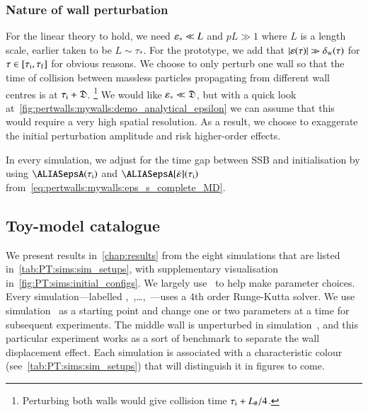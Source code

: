 \subsubsection{Nature of wall perturbation}
    For the linear theory to hold, we need $\varepsilon_\ast \ll L$ and $pL \gg 1$ where $L$ is a length scale, earlier taken to be $L\sim \tau_\ast$. For the prototype, we add that $\abs{\varepsilon(\tau)} \gg \delta_\mathrm{w}(\tau)$ for $\tau\in[\tau_\mathrm{i}, \tau_\mathrm{f}]$ for obvious reasons. %
    We choose to only perturb one wall so that the time of collision between massless particles propagating from different wall centres is at $ \tau_\mathrm{i} + \mathfrak{D}$.%
    \footnote{
        Perturbing both walls would give collision time $\tau_\mathrm{i} + L_{\#}/4$.
    } %
    We would like $\varepsilon_\ast \ll \mathfrak{D}$, but with a quick look at~\cref{fig:pertwalls:mywalls:demo_analytical_epsilon} we can assume that this would require a very high spatial resolution. As a result, we choose to exaggerate the initial perturbation amplitude and risk higher-order effects. %


    In every simulation, we adjust for the time gap between SSB and initialisation %
    by using $\epsA(\tau\ped{i})$ and $\epsA[\dot{\varepsilon}](\tau\ped{i})$ from~\cref{eq:pertwalls:mywalls:eps_s_complete_MD}.







\subsection{Toy-model catalogue}

   


    We present results in~\cref{chap:results} from the eight simulations that are listed in~\cref{tab:PT:sims:sim_setups}, with supplementary visualisation in~\cref{fig:PT:sims:initial_configs}. %
    We largely use~\citet{christiansenAsimulationDomainFormation2024} to help make parameter choices. 
    Every simulation---labelled ,~,\dots,~---uses a 4th order Runge-Kutta solver. 
    We use simulation~ as a starting point and change one or two parameters at a time for subsequent experiments. The middle wall is unperturbed in simulation~, and this particular experiment works as a sort of benchmark to separate the wall displacement effect. 
    Each simulation is associated with a characteristic colour (see~\cref{tab:PT:sims:sim_setups}) that will distinguish it in figures to come.

